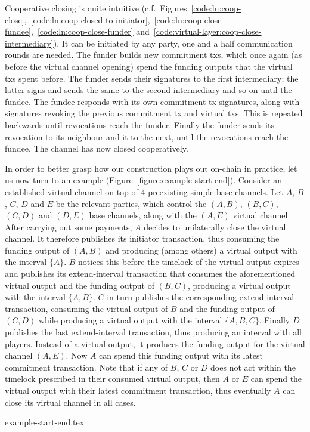   Cooperative closing is quite intuitive (c.f.\
  Figures~\ref{code:ln:coop-close},~\ref{code:ln:coop-closed-to-initiator},~\ref{code:ln:coop-close-fundee},~\ref{code:ln:coop-close-funder}
  and~\ref{code:virtual-layer:coop-close-intermediary}). It can be initiated by
  any party, one and a half communication rounds are needed. The funder builds
  new commitment txs, which once again (as before the virtual channel opening)
  spend the funding outputs that the virtual txs spent before. The funder sends
  their signatures to the first intermediary; the latter signs and sends the
  same to the second intermediary and so on until the fundee. The fundee
  responds with its own commitment tx signatures, along with signatures revoking
  the previous commitment tx and virtual txs. This is repeated backwards until
  revocations reach the funder. Finally the funder sends its revocation to its
  neighbour and it to the next, until the revocations reach the fundee. The
  channel has now closed cooperatively.

  In order to better grasp how our construction plays out on-chain in practice, let us
  now turn to an example (Figure~\ref{figure:example-start-end}). Consider an
  established virtual channel on top of $4$ preexisting simple base channels.
  Let $A$, $B$, $C$, $D$ and $E$ be the relevant parties, which control the $(A,
  B)$, $(B, C)$, $(C, D)$ and $(D, E)$ base channels, along with the $(A, E)$
  virtual channel. After carrying out some payments, $A$ decides to unilaterally
  close the virtual channel. It therefore publishes its initiator transaction,
  thus consuming the funding output of $(A, B)$ and producing (among others) a
  virtual output with the interval $\{A\}$. $B$ notices this before the timelock
  of the virtual output expires and publishes its extend-interval
  transaction that consumes the aforementioned virtual output and the funding
  output of $(B, C)$, producing a virtual output with the interval $\{A, B\}$.
  $C$ in turn publishes the corresponding extend-interval transaction, consuming
  the virtual output of $B$ and the funding output of $(C, D)$ while producing a
  virtual output with the interval $\{A, B, C\}$. Finally $D$ publishes the last
  extend-interval transaction, thus producing an interval with all players.
  Instead of a virtual output, it produces the funding output for the virtual
  channel $(A, E)$. Now $A$ can spend this funding output with its latest
  commitment transaction. Note that if any of $B$, $C$ or $D$ does
  not act within the timelock prescribed in their consumed virtual output, then
  $A$ or $E$ can spend the virtual output with their latest commitment
  transaction, thus eventually $A$ can close its virtual channel in all cases.

  \begin{figure*}
    {example-start-end.tex}
    \caption{$4$ simple channels supporting a virtual. $A$ initiates the closing
    procedure and no party is negligent. Virtual outputs are marked with their
    interval.}
    \label{figure:example-start-end}
  \end{figure*}
